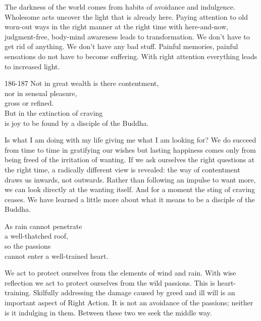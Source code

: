 \begin{dhpRefl}

The darkness of the world comes from habits of avoidance and
indulgence. Wholesome acts uncover the light that is already here.
Paying attention to old worn-out ways in the right manner at the
right time with here-and-now, judgment-free, body-mind awareness
leads to transformation. We don't have to get rid of anything. We
don't have any bad stuff. Painful memories, painful sensations do not
have to become suffering. With right attention everything leads to
increased light.

\end{dhpRefl}


\begin{dhpVerse}{186-187}
\label{dhp-186}\label{dhp-187}
Not in great wealth is there contentment,\\
nor in sensual pleasure,\\
gross or refined.\\
But in the extinction of craving\\
is joy to be found by a disciple of the Buddha.
\end{dhpVerse}

\begin{dhpRefl}

Is what I am doing with my life giving me what I am looking for? We
do succeed from time to time in gratifying our wishes but lasting
happiness comes only from being freed of the irritation of wanting.
If we ask ourselves the right questions at the right time, a
radically different view is revealed: the way of contentment draws us
inwards, not outwards. Rather than following an impulse to want more,
we can look directly at the wanting itself. And for a moment the
sting of craving ceases. We have learned a little more about what it
means to be a disciple of the Buddha.

\end{dhpRefl}


\begin{dhpVerse}{14}
\label{dhp-14}
As rain cannot penetrate\\
a well-thatched roof,\\
so the passions\\
cannot enter a well-trained heart.
\end{dhpVerse}

\begin{dhpRefl}

We act to protect ourselves from the elements of wind and rain. With
wise reflection we act to protect ourselves from the wild passions.
This is heart-training. Skilfully addressing the damage caused by
greed and ill will is an important aspect of Right Action. It is not
an avoidance of the passions; neither is it indulging in them.
Between these two we seek the middle way.

\end{dhpRefl}

